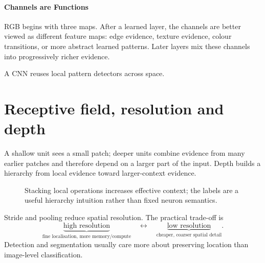 \paragraph{Channels are Functions}
RGB begins with three maps.
After a learned layer, the channels are better viewed as different feature maps: edge evidence, texture evidence, colour transitions, or more abstract learned patterns.
Later layers mix these channels into progressively richer evidence.


\begin{calloutmemoryhook}
A CNN reuses local pattern detectors across space.
\end{calloutmemoryhook}

\section{Receptive field, resolution and depth}
\label{sec:cnn-receptive-field}
A shallow unit sees a small patch; deeper units combine evidence from many earlier patches and therefore depend on a larger part of the input.
Depth builds a hierarchy from local evidence toward larger-context evidence.

\begin{figure}[htbp]
\centering
{}
\caption{Stacking local operations increases effective context; the labels are a useful hierarchy intuition rather than fixed neuron semantics.}
\end{figure}

Stride and pooling reduce spatial resolution.
The practical trade-off is
\[
\underbrace{\text{high resolution}}_{\text{fine localisation, more memory/compute}}
\quad\longleftrightarrow\quad
\underbrace{\text{low resolution}}_{\text{cheaper, coarser spatial detail}}.
\]
Detection and segmentation usually care more about preserving location than image-level classification.

